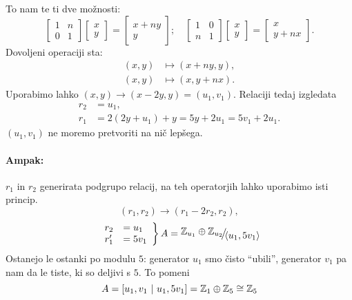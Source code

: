 \begin{zgled}
\begin{enumerate}
{			\ni To nam te ti dve mo\v znosti:
			\[
			\begin{bmatrix}
				1 & n \\ 0 & 1
			\end{bmatrix}
			\begin{bmatrix}
				x \\ y
			\end{bmatrix} =
			\begin{bmatrix}
				x + ny \\
				y
			\end{bmatrix}; \quad
			\begin{bmatrix}
				1 & 0 \\
				n & 1
			\end{bmatrix}
			\begin{bmatrix}
				x \\ y
			\end{bmatrix} =
			\begin{bmatrix}
				x \\ y + nx
			\end{bmatrix}.
			\]
			\ni Dovoljeni operaciji sta:
			\begin{align*}
				(x, y) &\mapsto (x + ny, y), \\
				(x, y) &\mapsto (x, y + nx).
			\end{align*}
			\ni Uporabimo lahko $(x, y) \to (x -2y, y) = (u_1, v_1)$. Relaciji tedaj izgledata
			\begin{align*}
				r_2 &= u_1, \\
				r_1 &= 2(2y + u_1) + y = 5y + 2u_1 = 5v_1 + 2u_1.
			\end{align*}
			$(u_1, v_1)$ ne moremo pretvoriti na ni\v c lep\v sega.
			\paragraph{Ampak:} $r_1$ in $r_2$ generirata podgrupo relacij, na teh operatorjih lahko uporabimo isti princip.
			\[
				(r_1, r_2) \to (r_1 - 2r_2, r_2),
			\]
			\[
				\left.
				\begin{array}{rl}
					r_2 &= u_1 \\
					r_1' &= 5v_1
				\end{array} \right\} A = \quot{\Z_{u_1} \oplus \Z_{u_2}}{\langle u_1, 5v_1\rangle}
			\]
			Ostanejo le ostanki po modulu $5$: generator $u_1$ smo \v cisto "`ubili"', generator $v_1$ pa nam da le tiste, ki so deljivi s $5$. To pomeni
			\[
				A = [u_1 ,v_1\ |\ u_1, 5v_1] = \mathbb{Z}_1 \oplus \mathbb{Z}_5 \cong \mathbb{Z}_5
			\]
		}
	\end{enumerate}
\end{zgled}

